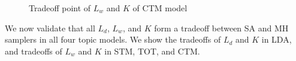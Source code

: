 \documentclass[10pt,journal,cspaper,compsoc]{IEEEtran}
\begin{document}
\begin{figure}[t]   
	\centering
	\caption{Tradeoff point of $L_w$ and $K$ of CTM model}
\end{figure}

We now validate that all $L_d$, $L_w$, and $K$
form a tradeoff between SA and MH
samplers in all four topic models.
We show the tradeoffs of $L_d$ and $K$ in LDA,
and tradeoffs of $L_w$ and $K$ in STM, TOT, and CTM.
\\
\end{document}
